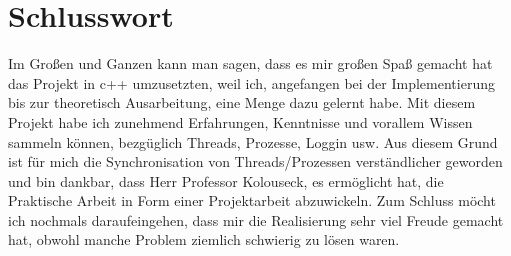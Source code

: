 \documentclass[a4paper,12pt]{article}
\begin{document}
\section{Schlusswort}
Im Großen und Ganzen kann man sagen, dass es mir großen Spaß gemacht hat das Projekt in c++ umzusetzten, weil ich, angefangen bei der Implementierung bis zur theoretisch Ausarbeitung,
eine Menge dazu gelernt habe. Mit diesem Projekt habe ich zunehmend Erfahrungen, Kenntnisse und vorallem Wissen sammeln können, bezgüglich Threads, Prozesse, Loggin usw.
Aus diesem Grund ist für mich die Synchronisation von Threads/Prozessen verständlicher geworden und bin dankbar, dass Herr Professor Kolouseck, es ermöglicht hat, die Praktische Arbeit
in Form einer Projektarbeit abzuwickeln. Zum Schluss möcht ich nochmals daraufeingehen, dass mir die Realisierung sehr viel Freude gemacht hat, obwohl manche Problem ziemlich schwierig zu lösen waren.
\end{document}
